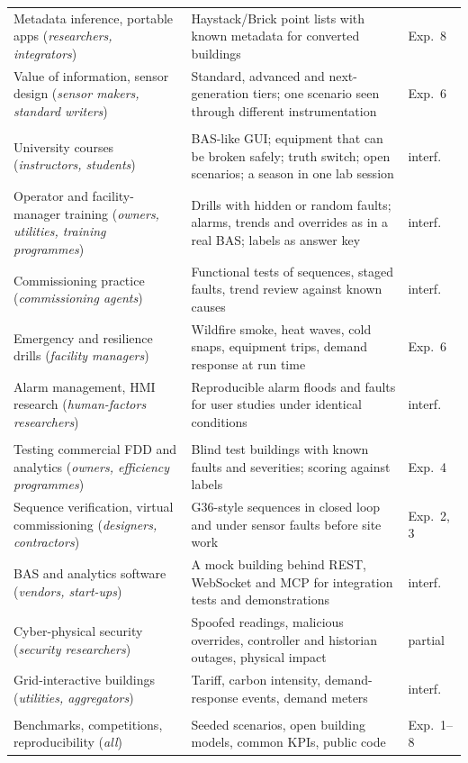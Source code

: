 \documentclass[preprint,12pt,authoryear=false]{elsarticle}
\begin{document}
\begin{table}[!htbp]
\begin{tabularx}{\textwidth}{@{}>{\raggedright\arraybackslash}p{50mm}>{\raggedright\arraybackslash}X>{\raggedright\arraybackslash}p{14mm}@{}}
Metadata inference, portable apps (\emph{researchers, integrators}) & Haystack/Brick point lists with known metadata for converted buildings \cite{gao2015metadata} & Exp.~8 \\
Value of information, sensor design (\emph{sensor makers, standard writers}) & Standard, advanced and next-generation tiers; one scenario seen through different instrumentation & Exp.~6 \\
\multicolumn{3}{@{}l}{\textbf{Education and workforce development}}\\
University courses (\emph{instructors, students}) & BAS-like GUI; equipment that can be broken safely; truth switch; open scenarios; a season in one lab session & interf. \\
Operator and facility-manager training (\emph{owners, utilities, training programmes}) & Drills with hidden or random faults; alarms, trends and overrides as in a real BAS; labels as answer key & interf. \\
Commissioning practice (\emph{commissioning agents}) & Functional tests of sequences, staged faults, trend review against known causes & interf. \\
Emergency and resilience drills (\emph{facility managers}) & Wildfire smoke, heat waves, cold snaps, equipment trips, demand response at run time & Exp.~6 \\
Alarm management, HMI research (\emph{human-factors researchers}) & Reproducible alarm floods and faults for user studies under identical conditions \cite{isa182} & interf. \\
\multicolumn{3}{@{}l}{\textbf{Industry practice}}\\
Testing commercial FDD and analytics (\emph{owners, efficiency programmes}) & Blind test buildings with known faults and severities; scoring against labels & Exp.~4 \\
Sequence verification, virtual commissioning (\emph{designers, contractors}) & G36-style sequences in closed loop and under sensor faults before site work \cite{wetter2022obc} & Exp.~2, 3 \\
BAS and analytics software (\emph{vendors, start-ups}) & A mock building behind REST, WebSocket and MCP for integration tests and demonstrations & interf. \\
Cyber-physical security (\emph{security researchers}) & Spoofed readings, malicious overrides, controller and historian outages, physical impact \cite{granzer2010security} & partial \\
Grid-interactive buildings (\emph{utilities, aggregators}) & Tariff, carbon intensity, demand-response events, demand meters \cite{neukomm2019geb} & interf. \\
\multicolumn{3}{@{}l}{\textbf{Research community}}\\
Benchmarks, competitions, reproducibility (\emph{all}) & Seeded scenarios, open building models, common KPIs, public code & Exp.~1--8 \\
\bottomrule
\end{tabularx}
\end{table}
\end{document}
